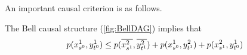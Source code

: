An important causal criterion is as follows. 
\begin{prop} \label{prop:CH}
The Bell causal structure (\cref{fig:BellDAG}) implies that
\begin{align*}
p\lparen{x}_{s^0}^{1} , {y}_{t^0}^{1}\rparen\leq p\lparen\overline{{x}_{s^1}^{2}} , \overline{{y}_{t^1}^{2}}\rparen+p\lparen{x}_{s^0}^{1} , {y}_{t^1}^{2}\rparen+p\lparen{x}_{s^1}^{2} ,
   {y}_{t^0}^{1}\rparen
\end{align*}
\end{prop}

